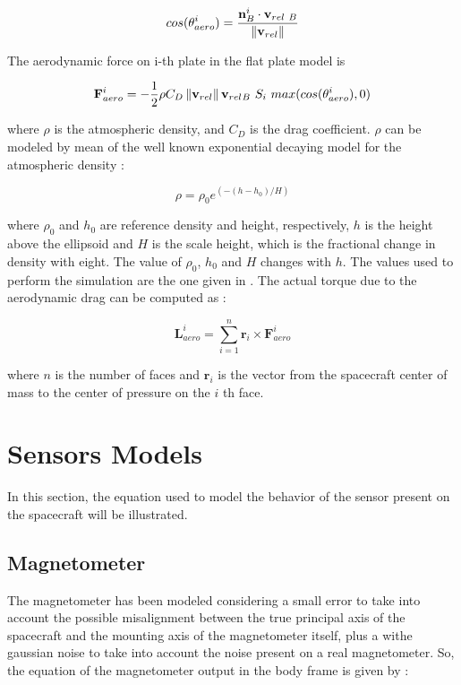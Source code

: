 \documentclass[11pt,a4paper]{report}
\begin{document}
\begin{equation}
 cos(\theta_{aero}^{i}) = \frac{\mathbf{n}_{B}^{i} \cdot \mathbf{v}_{rel\ B}}{\norm{\mathbf{v}_{rel}}}
\end{equation}

The aerodynamic force on i-th plate in the flat plate model is

\begin{equation}
 \mathbf{F}_{aero}^{i} = - \frac{1}{2} \rho C_{D} \norm{\mathbf{v}_{rel}} \mathbf{v}_{rel_{} B}\ S_{i}\ max(cos(\theta_{aero}^{i}),0)
\end{equation}

where $\rho$ is the atmospheric density, and $C_D$ is the drag coefficient.  
$\rho$ can be modeled by mean of the well known exponential decaying model for the atmospheric density :

\begin{equation}
 \rho = \rho_{0} e^{(-(h-h_{0})/H)}
\end{equation}

where $\rho_{0}$ and $h_{0}$ are reference density and height, respectively, $h$ is the height above the ellipsoid and $H$ is the scale height, which is the fractional change in density with eight.
The value of $\rho_{0}$, $h_{0}$  and $H$ changes with $h$. 
The values used to perform the simulation are the one given in \cite{Ref:Books:Fundamentals}.
The actual torque due to the aerodynamic drag can be computed as : 

\begin{equation}
 \mathbf{L}_{aero}^{i} = \sum\limits_{i=1}^n  \mathbf{r}_{i} \times \mathbf{F}_{aero}^{i}
\end{equation}

where $n$ is the number of faces and $\mathbf{r}_{i}$ is the vector from the spacecraft center of mass to the center of pressure on the $i$ th face.

\section{Sensors Models}
In this section, the equation used to model the behavior of the sensor present on the spacecraft will be illustrated.
\subsection{Magnetometer}
The magnetometer has been modeled considering a small error to take into account the possible misalignment between the true principal axis of the spacecraft and the mounting axis of the magnetometer itself, plus a withe gaussian noise to take into account the noise present on a real magnetometer.
So, the equation of the magnetometer output in the body frame is given by : 
\end{document}
